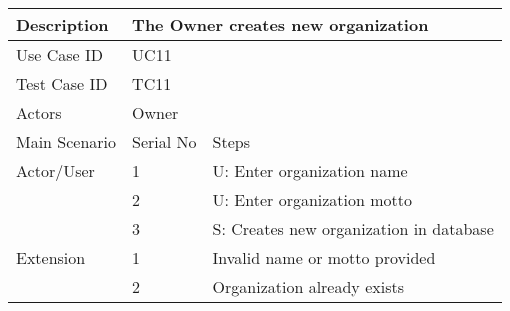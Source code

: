 \begin{table}[]
    \centering
    \begin{tabular}{|l|llll|}
        \hline
        Description   & \multicolumn{4}{l|}{The Owner creates new organization}                                                                \\ \hline
        Use Case ID   & \multicolumn{4}{l|}{UC11}                                                                                              \\ \hline
        Test Case ID  & \multicolumn{4}{l|}{TC11}                                                                                              \\ \hline
        Actors        & \multicolumn{4}{l|}{Owner}                                                                                             \\ \hline
        Main Scenario & \multicolumn{1}{l|}{Serial No}                          & \multicolumn{3}{l|}{Steps}                                   \\ \hline
        Actor/User    & \multicolumn{1}{l|}{1}                                  & \multicolumn{3}{l|}{U: Enter organization name}              \\ \hline
                      & \multicolumn{1}{l|}{2}                                  & \multicolumn{3}{l|}{U: Enter organization motto}             \\ \hline
                      & \multicolumn{1}{l|}{3}                                  & \multicolumn{3}{l|}{S: Creates new organization in database} \\ \hline
        Extension     & \multicolumn{1}{l|}{1}                                  & \multicolumn{3}{l|}{Invalid name or motto provided}          \\ \hline
                      & \multicolumn{1}{l|}{2}                                  & \multicolumn{3}{l|}{Organization already exists}             \\ \hline
    \end{tabular}
\end{table}

